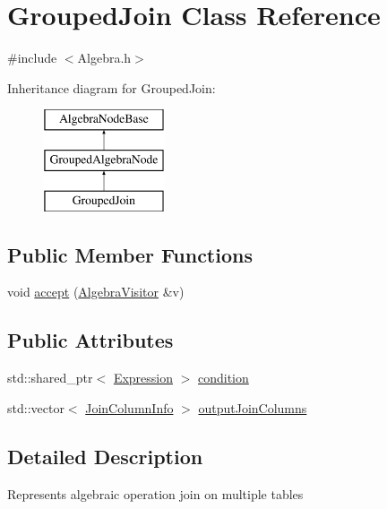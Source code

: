 \hypertarget{class_grouped_join}{\section{Grouped\+Join Class Reference}
\label{class_grouped_join}
}


{\ttfamily \#include $<$Algebra.\+h$>$}

Inheritance diagram for Grouped\+Join\+:\begin{figure}[H]
\begin{center}
\leavevmode
\includegraphics[height=3.000000cm]{class_grouped_join}
\end{center}
\end{figure}
\subsection*{Public Member Functions}
\begin{DoxyCompactItemize}
\item 
void \hyperlink{class_grouped_join_aa067c1a349478bfdeae77ed3a541375d}{accept} (\hyperlink{class_algebra_visitor}{Algebra\+Visitor} \&v)
\end{DoxyCompactItemize}
\subsection*{Public Attributes}
\begin{DoxyCompactItemize}
\item 
std\+::shared\+\_\+ptr$<$ \hyperlink{class_expression}{Expression} $>$ \hyperlink{class_grouped_join_a517b47e21d6852335b50537c474c9c62}{condition}
\item 
std\+::vector$<$ \hyperlink{class_join_column_info}{Join\+Column\+Info} $>$ \hyperlink{class_grouped_join_ab4e436f7abb9990000a7f2ef0596960e}{output\+Join\+Columns}
\end{DoxyCompactItemize}


\subsection{Detailed Description}
Represents algebraic operation join on multiple tables 

